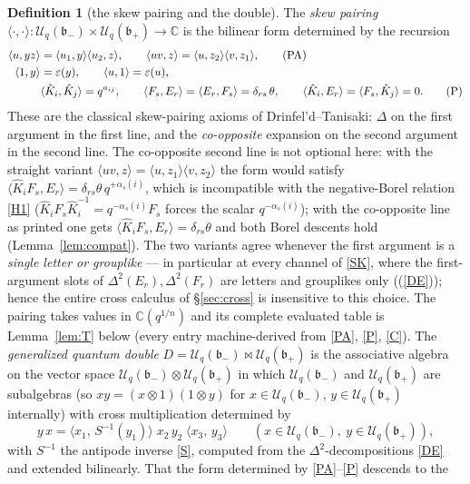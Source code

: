 \documentclass[11pt]{article}
\theoremstyle{definition}
\newtheorem{definition}[theorem]{Definition}
\theoremstyle{remark}
\newcommand{\la}{\langle}
\newcommand{\ra}{\rangle}
\newcommand{\C}{\mathbb{C}}
\newcommand{\Uq}{\mathcal{U}_q}
\newcommand{\bp}{\mathfrak{b}_+}
\newcommand{\bm}{\mathfrak{b}_-}
\newcommand{\del}{\delta}
\newcommand{\ptn}{\bowtie}
\newcommand{\hK}{\hat K}
\newcommand{\vep}{\varepsilon}
\newcommand{\tht}{\theta}
\begin{document}
\begin{definition}[the skew pairing and the double]\label{def:D}
The \emph{skew pairing}
$\la\cdot,\cdot\ra:\Uq(\bm)\times\Uq(\bp)\to\C$ is the bilinear form
determined by the recursion
\begin{align}
\la u,yz\ra&=\la u_1,y\ra\la u_2,z\ra,\qquad
 \la uv,z\ra=\la u,z_2\ra\la v,z_1\ra,\label{PA}\tag{PA}\\
\la1,y\ra&=\vep(y),\qquad\la u,1\ra=\vep(u),\notag\\
&\la\hK_i,\hK_j\ra=q^{a_{ij}},\qquad
\la F_s,E_r\ra=\la E_r,F_s\ra=\del_{rs}\,\tht,\qquad
\la\hK_i,E_r\ra=\la F_s,\hK_j\ra=0 .\label{P}\tag{P}
\end{align}
These are the classical skew-pairing axioms of Drinfel'd--Tanisaki:
$\Delta$ on the first argument in the first line, and the
\emph{co-opposite} expansion on the second argument in the second
line.  The co-opposite second line is not optional here: with the
straight variant $\la uv,z\ra=\la u,z_1\ra\la v,z_2\ra$ the form
would satisfy $\la\hK_iF_s,E_r\ra=\del_{rs}\tht\,q^{+\alpha_s(i)}$,
which is incompatible with the negative-Borel relation \eqref{H1}
($\hK_iF_s\hK_i^{-1}=q^{-\alpha_s(i)}F_s$ forces the scalar
$q^{-\alpha_s(i)}$); with the co-opposite line as printed one gets
$\la\hK_iF_s,E_r\ra=\del_{rs}\tht$ and both Borel descents hold
(Lemma~\ref{lem:compat}).  The two variants agree whenever the
first argument is a \emph{single letter or grouplike} — in
particular at every channel of \eqref{SK}, where the first-argument
slots of $\Delta^2(E_r),\Delta^2(F_r)$ are letters and grouplikes
only ((\ref{DE})); hence the entire cross calculus of
\S\ref{sec:cross} is insensitive to this choice.  The pairing takes
values in $\C(q^{1/n})$ and
its complete evaluated table is Lemma~\ref{lem:T} below (every entry
machine-derived from \eqref{PA}, \eqref{P}, \eqref{C}).  The
\emph{generalized quantum double}
$D=\Uq(\bm)\ptn\Uq(\bp)$ is the associative algebra on the vector
space $\Uq(\bm)\otimes\Uq(\bp)$ in which $\Uq(\bm)$ and $\Uq(\bp)$
are subalgebras (so $xy=(x\otimes1)(1\otimes y)$ for $x\in\Uq(\bm)$,
$y\in\Uq(\bp)$ internally) with cross multiplication determined by
\begin{equation}
y\,x=\la x_1,\,S^{-1}(y_1)\ra\;x_2\,y_2\;\la x_3,\,y_3\ra
\qquad(x\in\Uq(\bm),\ y\in\Uq(\bp)),\label{SK}\tag{SK}
\end{equation}
with $S^{-1}$ the antipode inverse \eqref{S}, computed from the
$\Delta^2$-decompositions \eqref{DE} and extended bilinearly.
That the form determined by \eqref{PA}--\eqref{P} descends to the

\end{definition}
\end{document}
